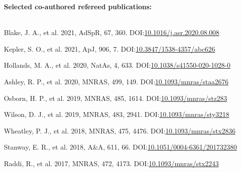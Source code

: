 \documentclass[print]{cv-style}
\begin{document}
{\bf Selected co-authored refereed publications:}\\
~\vspace{-2mm}\\
\begin{entrylist}
  {\small Blake, J. A., et al. 2021, AdSpR, 67, 360. \textsc{DOI:}\href{http://dx.doi.org/10.1016/j.asr.2020.08.008}{10.1016/j.asr.2020.08.008}}
  
  {\small Kepler, S. O., et al. 2021, ApJ, 906, 7. \textsc{DOI:}\href{http://dx.doi.org/10.3847/1538-4357/abc626}{10.3847/1538-4357/abc626}}

  {\small Hollands, M. A., et al. 2020, NatAs, 4, 633. \textsc{DOI:}\href{http://dx.doi.org/10.1038/s41550-020-1028-0}{10.1038/s41550-020-1028-0}}

  {\small Ashley, R. P., et al. 2020, MNRAS, 499, 149. \textsc{DOI:}\href{http://dx.doi.org/10.1093/mnras/staa2676}{10.1093/mnras/staa2676}}

  {\small Osborn, H. P., et al. 2019, MNRAS, 485, 1614. \textsc{DOI:}\href{http://dx.doi.org/10.1093/mnras/stz283}{10.1093/mnras/stz283}}

  {\small Wilson, D. J., et al. 2019, MNRAS, 483, 2941. \textsc{DOI:}\href{http://dx.doi.org/10.1093/mnras/sty3218}{10.1093/mnras/sty3218 }}

  {\small Wheatley, P. J., et al. 2018, MNRAS, 475, 4476. \textsc{DOI:}\href{http://dx.doi.org/10.1093/mnras/stx2836}{10.1093/mnras/stx2836}}

  {\small Stanway, E. R., et al. 2018, A\&A, 611, 66. \textsc{DOI:}\href{http://dx.doi.org/10.1051/0004-6361/201732380}{10.1051/0004-6361/201732380}}

  {\small Raddi, R., et al. 2017, MNRAS, 472, 4173. \textsc{DOI:}\href{http://dx.doi.org/10.1093/mnras/stx2243}{10.1093/mnras/stx2243}}


\end{entrylist}
\end{document}
